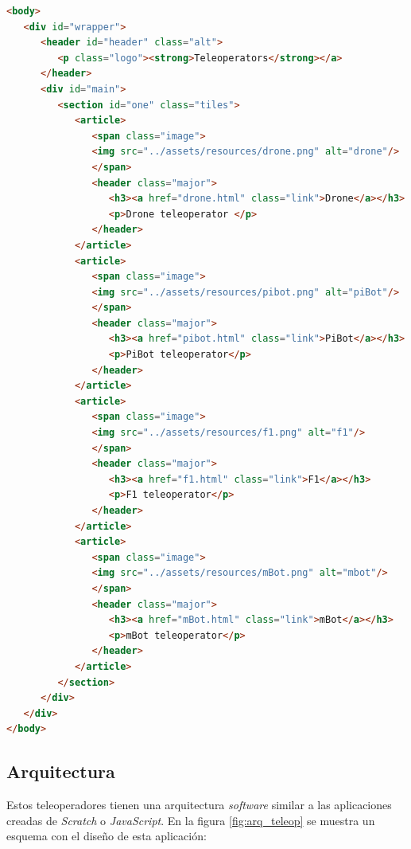 \begin{lstlisting}[language=html,label=lst:teleopMain,caption=Código HTML de la interfaz para acceder a los teleoperadores]
<body>
   <div id="wrapper">
      <header id="header" class="alt">
         <p class="logo"><strong>Teleoperators</strong></a>
      </header>
      <div id="main">
         <section id="one" class="tiles">
            <article>
               <span class="image">
               <img src="../assets/resources/drone.png" alt="drone"/>
               </span>
               <header class="major">
                  <h3><a href="drone.html" class="link">Drone</a></h3>
                  <p>Drone teleoperator </p>
               </header>
            </article>
            <article>
               <span class="image">
               <img src="../assets/resources/pibot.png" alt="piBot"/>
               </span>
               <header class="major">
                  <h3><a href="pibot.html" class="link">PiBot</a></h3>
                  <p>PiBot teleoperator</p>
               </header>
            </article>
            <article>
               <span class="image">
               <img src="../assets/resources/f1.png" alt="f1"/>
               </span>
               <header class="major">
                  <h3><a href="f1.html" class="link">F1</a></h3>
                  <p>F1 teleoperator</p>
               </header>
            </article>
            <article>
               <span class="image">
               <img src="../assets/resources/mBot.png" alt="mbot"/>
               </span>
               <header class="major">
                  <h3><a href="mBot.html" class="link">mBot</a></h3>
                  <p>mBot teleoperator</p>
               </header>
            </article>
         </section>
      </div>
   </div>
</body>
\end{lstlisting}

\subsection{Arquitectura}
\label{subsec:teleop_arq}

Estos teleoperadores tienen una arquitectura \textit{software} similar a las aplicaciones creadas de \textit{Scratch} o \textit{JavaScript}. En la figura \ref{fig:arq_teleop} se muestra un esquema con el diseño de esta aplicación:

